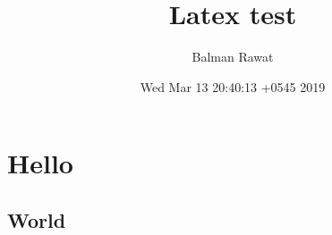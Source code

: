 \documentclass[11pt]{article}
\author{Balman Rawat}
\date{Wed Mar 13 20:40:13 +0545 2019}
\title{Latex test}
\begin{document}
\maketitle
\tableofcontents


\section{Hello}
\label{sec:org176a807}
\subsection{World}
\label{sec:orgdf9550e}
\end{document}

